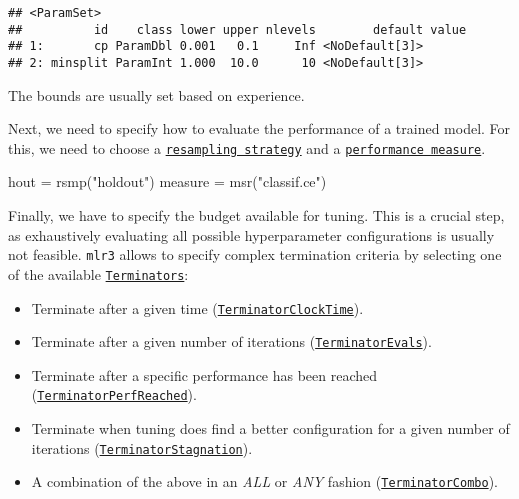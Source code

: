 \documentclass[
]{scrbook}
\newenvironment{Shaded}{\begin{snugshade}}{\end{snugshade}}
\newcommand{\FunctionTok}[1]{\textcolor[rgb]{0.00,0.00,0.00}{#1}}
\newcommand{\NormalTok}[1]{#1}
\newcommand{\OtherTok}[1]{\textcolor[rgb]{0.56,0.35,0.01}{#1}}
\newcommand{\StringTok}[1]{\textcolor[rgb]{0.31,0.60,0.02}{#1}}
\providecommand{\tightlist}{%
  \setlength{\itemsep}{0pt}\setlength{\parskip}{0pt}}
\renewenvironment{Shaded} {\begin{snugshade}\small} {\end{snugshade}}
\begin{document}
\begin{verbatim}
## <ParamSet>
##          id    class lower upper nlevels        default value
## 1:       cp ParamDbl 0.001   0.1     Inf <NoDefault[3]>      
## 2: minsplit ParamInt 1.000  10.0      10 <NoDefault[3]>
\end{verbatim}

The bounds are usually set based on experience.

Next, we need to specify how to evaluate the performance of a trained model.
For this, we need to choose a \href{https://mlr3.mlr-org.com/reference/Resampling.html}{\texttt{resampling\ strategy}} and a \href{https://mlr3.mlr-org.com/reference/Measure.html}{\texttt{performance\ measure}}.

\begin{Shaded}
\begin{Highlighting}[]
\NormalTok{hout }\OtherTok{=} \FunctionTok{rsmp}\NormalTok{(}\StringTok{"holdout"}\NormalTok{)}
\NormalTok{measure }\OtherTok{=} \FunctionTok{msr}\NormalTok{(}\StringTok{"classif.ce"}\NormalTok{)}
\end{Highlighting}
\end{Shaded}

Finally, we have to specify the budget available for tuning.
This is a crucial step, as exhaustively evaluating all possible hyperparameter configurations is usually not feasible.
\texttt{mlr3} allows to specify complex termination criteria by selecting one of the available \href{https://bbotk.mlr-org.com/reference/Terminator.html}{\texttt{Terminators}}:

\begin{itemize}
\tightlist
\item
  Terminate after a given time (\href{https://bbotk.mlr-org.com/reference/mlr_terminators_clock_time.html}{\texttt{TerminatorClockTime}}).
\item
  Terminate after a given number of iterations (\href{https://bbotk.mlr-org.com/reference/mlr_terminators_evals.html}{\texttt{TerminatorEvals}}).
\item
  Terminate after a specific performance has been reached (\href{https://bbotk.mlr-org.com/reference/mlr_terminators_perf_reached.html}{\texttt{TerminatorPerfReached}}).
\item
  Terminate when tuning does find a better configuration for a given number of iterations (\href{https://bbotk.mlr-org.com/reference/mlr_terminators_stagnation.html}{\texttt{TerminatorStagnation}}).
\item
  A combination of the above in an \emph{ALL} or \emph{ANY} fashion (\href{https://bbotk.mlr-org.com/reference/mlr_terminators_combo.html}{\texttt{TerminatorCombo}}).
\end{itemize}
\end{document}

